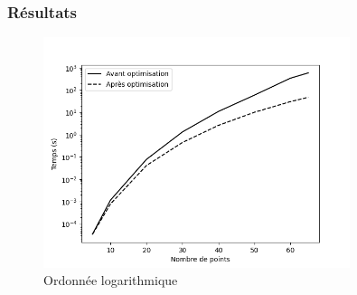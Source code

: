 \documentclass{beamer}
\begin{document}
\begin{frame}
    \frametitle{Résultats}
    \begin{figure}%
        \centering
        \includegraphics[width=0.8\textwidth]{../images/analyse_cmpx_log.png}
        \caption{Ordonnée logarithmique}
    \end{figure}
\end{frame}
\end{document}
